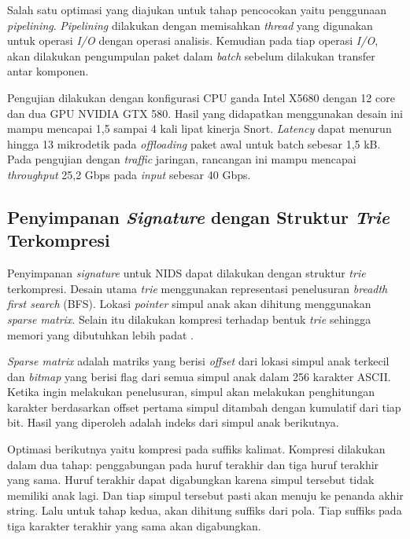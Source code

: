     Salah satu optimasi yang diajukan untuk tahap pencocokan yaitu penggunaan \emph{pipelining}. \emph{Pipelining} dilakukan dengan memisahkan \emph{thread} yang digunakan untuk operasi \emph{I/O} dengan operasi analisis. Kemudian pada tiap operasi \emph{I/O}, akan dilakukan pengumpulan paket dalam \emph{batch} sebelum dilakukan transfer antar komponen. 

    Pengujian dilakukan dengan konfigurasi CPU ganda Intel X5680 dengan 12 core dan dua GPU NVIDIA GTX 580. Hasil yang didapatkan menggunakan desain ini mampu mencapai 1,5 sampai 4 kali lipat kinerja Snort. \emph{Latency} dapat menurun hingga 13 mikrodetik pada \emph{offloading} paket awal untuk batch sebesar 1,5 kB. Pada pengujian dengan \emph{traffic} jaringan, rancangan ini mampu mencapai \emph{throughput} 25,2 Gbps pada \emph{input} sebesar 40 Gbps.

  \subsection{Penyimpanan \emph{Signature} dengan Struktur \emph{Trie} Terkompresi}

    Penyimpanan \emph{signature} untuk NIDS dapat dilakukan dengan struktur \emph{trie} terkompresi. Desain utama \emph{trie} menggunakan representasi penelusuran \emph{breadth first search} (BFS). Lokasi \emph{pointer} simpul anak akan dihitung menggunakan \emph{sparse matrix}. Selain itu dilakukan kompresi terhadap bentuk \emph{trie} sehingga memori yang dibutuhkan lebih padat \citep{bellekens2014}.

    \emph{Sparse matrix} adalah matriks yang berisi \emph{offset} dari lokasi simpul anak terkecil dan \emph{bitmap} yang berisi flag dari semua simpul anak dalam 256 karakter ASCII. Ketika ingin melakukan penelusuran, simpul akan melakukan penghitungan karakter berdasarkan offset pertama simpul ditambah dengan kumulatif dari tiap bit. Hasil yang diperoleh adalah indeks dari simpul anak berikutnya.

    Optimasi berikutnya yaitu kompresi pada suffiks kalimat. Kompresi dilakukan dalam dua tahap: penggabungan pada huruf terakhir dan tiga huruf terakhir yang sama. Huruf terakhir dapat digabungkan karena simpul tersebut tidak memiliki anak lagi. Dan tiap simpul tersebut pasti akan menuju ke penanda akhir string. Lalu untuk tahap kedua, akan dihitung suffiks dari pola. Tiap suffiks pada tiga karakter terakhir yang sama akan digabungkan.
    

